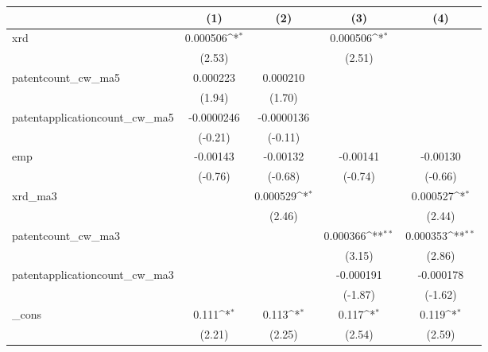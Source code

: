{
\def\sym#1{\ifmmode^{#1}\else\(^{#1}\)\fi}
\begin{tabular}{l*{4}{c}}
\hline\hline
            &\multicolumn{1}{c}{(1)}         &\multicolumn{1}{c}{(2)}         &\multicolumn{1}{c}{(3)}         &\multicolumn{1}{c}{(4)}         \\
\hline
xrd         &    0.000506\sym{*}  &                     &    0.000506\sym{*}  &                     \\
            &      (2.53)         &                     &      (2.51)         &                     \\
[1em]
patentcount\_cw\_ma5&    0.000223         &    0.000210         &                     &                     \\
            &      (1.94)         &      (1.70)         &                     &                     \\
[1em]
patentapplicationcount\_cw\_ma5&  -0.0000246         &  -0.0000136         &                     &                     \\
            &     (-0.21)         &     (-0.11)         &                     &                     \\
[1em]
emp         &    -0.00143         &    -0.00132         &    -0.00141         &    -0.00130         \\
            &     (-0.76)         &     (-0.68)         &     (-0.74)         &     (-0.66)         \\
[1em]
xrd\_ma3     &                     &    0.000529\sym{*}  &                     &    0.000527\sym{*}  \\
            &                     &      (2.46)         &                     &      (2.44)         \\
[1em]
patentcount\_cw\_ma3&                     &                     &    0.000366\sym{**} &    0.000353\sym{**} \\
            &                     &                     &      (3.15)         &      (2.86)         \\
[1em]
patentapplicationcount\_cw\_ma3&                     &                     &   -0.000191         &   -0.000178         \\
            &                     &                     &     (-1.87)         &     (-1.62)         \\
[1em]
\_cons      &       0.111\sym{*}  &       0.113\sym{*}  &       0.117\sym{*}  &       0.119\sym{*}  \\
            &      (2.21)         &      (2.25)         &      (2.54)         &      (2.59)         \\

\end{tabular}}
